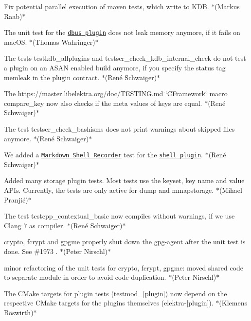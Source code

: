\begin{DoxyItemize}
\item Fix potential parallel execution of maven tests, which write to K\+DB. $\ast$(Markus Raab)$\ast$
\item The unit test for the \href{https://www.libelektra.org/plugins/dbus}{\tt {\ttfamily dbus} plugin} does not leak memory anymore, if it fails on mac\+OS. $\ast$(Thomas Wahringer)$\ast$
\item The tests {\ttfamily testkdb\+\_\+allplugins} and {\ttfamily testscr\+\_\+check\+\_\+kdb\+\_\+internal\+\_\+check} do not test a plugin on an A\+S\+AN enabled build anymore, if you specify the status tag {\ttfamily memleak} in the plugin contract. $\ast$(René Schwaiger)$\ast$
\item The https\+://master.libelektra.\+org/doc/\+T\+E\+S\+T\+I\+NG.md \char`\"{}\+C\+Framework\char`\"{} macro {\ttfamily compare\+\_\+key} now also checks if the meta values of keys are equal. $\ast$(René Schwaiger)$\ast$
\item The test {\ttfamily testscr\+\_\+check\+\_\+bashisms} does not print warnings about skipped files anymore. $\ast$(René Schwaiger)$\ast$
\item We added a \href{https://master.libelektra.org/tests/shell/shell_recorder/tutorial_wrapper}{\tt Markdown Shell Recorder} test for the \href{https://www.libelektra.org/plugins/shell}{\tt {\ttfamily shell} plugin}. $\ast$(René Schwaiger)$\ast$
\item Added many storage plugin tests. Most tests use the keyset, key name and value A\+P\+Is. Currently, the tests are only active for {\ttfamily dump} and {\ttfamily mmapstorage}. $\ast$(Mihael Pranjić)$\ast$
\item The test {\ttfamily testcpp\+\_\+contextual\+\_\+basic} now compiles without warnings, if we use Clang 7 as compiler. $\ast$(René Schwaiger)$\ast$
\item crypto, fcrypt and gpgme properly shut down the gpg-\/agent after the unit test is done. See \#1973 . $\ast$(Peter Nirschl)$\ast$
\item minor refactoring of the unit tests for crypto, fcrypt, gpgme\+: moved shared code to separate module in order to avoid code duplication. $\ast$(Peter Nirschl)$\ast$
\item The C\+Make targets for plugin tests ({\ttfamily testmod\+\_\+\mbox{[}plugin\mbox{]}}) now depend on the respective C\+Make targets for the plugins themselves ({\ttfamily elektra-\/\mbox{[}plugin\mbox{]}}). $\ast$(Klemens Böswirth)$\ast$

\end{DoxyItemize}

